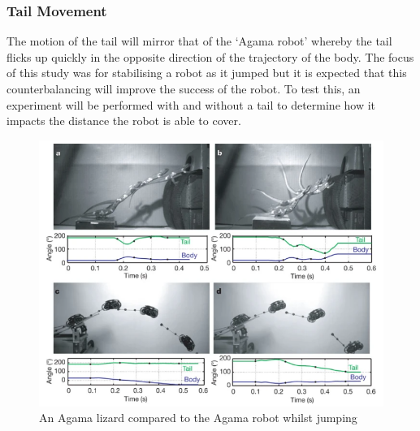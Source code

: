 \documentclass{article}
\begin{document}
\subsubsection{Tail Movement}
\label{sec:Tail Movement}
The motion of the tail will mirror that of the ‘Agama robot’ whereby the tail flicks up quickly in the opposite direction of the trajectory of the body.  The focus of this study was for stabilising a robot as it jumped but it is expected that this counterbalancing  will improve the success of the robot. To test this, an experiment will be performed with and without a tail to determine how it impacts the distance the robot is able to cover. 
\begin{figure}[H]
\centering
\includegraphics[scale=0.6]{agamaJump}
\caption{An Agama lizard compared to the Agama robot whilst jumping \citep{agama}}
\end{figure}
\end{document}
